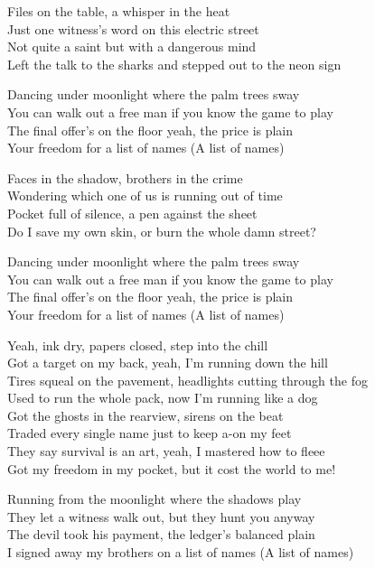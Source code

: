\begin{lyrics}
Files on the table, a whisper in the heat\\
Just one witness's word on this electric street\\
Not quite a saint but with a dangerous mind\\
Left the talk to the sharks and stepped out to the neon sign

Dancing under moonlight where the palm trees sway\\
You can walk out a free man if you know the game to play\\
The final offer's on the floor yeah, the price is plain\\
Your freedom for a list of names (A list of names)

Faces in the shadow, brothers in the crime\\
Wondering which one of us is running out of time\\
Pocket full of silence, a pen against the sheet\\
Do I save my own skin, or burn the whole damn street?

Dancing under moonlight where the palm trees sway\\
You can walk out a free man if you know the game to play\\
The final offer's on the floor yeah, the price is plain\\
Your freedom for a list of names (A list of names)

Yeah, ink dry, papers closed, step into the chill\\
Got a target on my back, yeah, I'm running down the hill\\
Tires squeal on the pavement, headlights cutting through the fog\\
Used to run the whole pack, now I'm running like a dog\\
Got the ghosts in the rearview, sirens on the beat\\
Traded every single name just to keep a-on my feet\\
They say survival is an art, yeah, I mastered how to fleee\\
Got my freedom in my pocket, but it cost the world to me!

Running from the moonlight where the shadows play\\
They let a witness walk out, but they hunt you anyway\\
The devil took his payment, the ledger's balanced plain\\
I signed away my brothers on a list of names (A list of names)
\end{lyrics}

